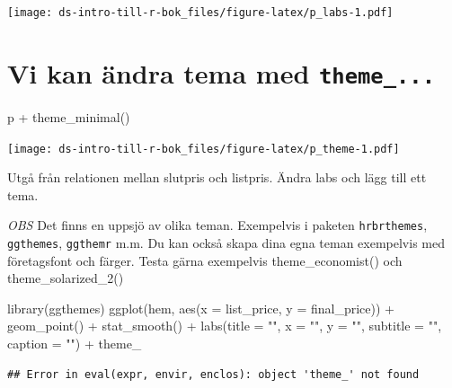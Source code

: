 \documentclass[
]{book}
\newenvironment{Shaded}{\begin{snugshade}}{\end{snugshade}}
\newcommand{\AttributeTok}[1]{\textcolor[rgb]{0.77,0.63,0.00}{#1}}
\newcommand{\FunctionTok}[1]{\textcolor[rgb]{0.00,0.00,0.00}{#1}}
\newcommand{\NormalTok}[1]{#1}
\newcommand{\SpecialCharTok}[1]{\textcolor[rgb]{0.00,0.00,0.00}{#1}}
\newcommand{\StringTok}[1]{\textcolor[rgb]{0.31,0.60,0.02}{#1}}
\begin{document}
\texttt{[image: ds-intro-till-r-bok\_files/figure-latex/p\_labs-1.pdf]}

\hypertarget{vi-kan-uxe4ndra-tema-med-theme_...}{%
\section{\texorpdfstring{Vi kan ändra tema med \texttt{theme\_...}}{Vi kan ändra tema med theme\_...}}\label{vi-kan-uxe4ndra-tema-med-theme_...}}

\begin{Shaded}
\begin{Highlighting}[]
\NormalTok{p }\SpecialCharTok{+} \FunctionTok{theme\_minimal}\NormalTok{()}
\end{Highlighting}
\end{Shaded}

\texttt{[image: ds-intro-till-r-bok\_files/figure-latex/p\_theme-1.pdf]}

Utgå från relationen mellan slutpris och listpris. Ändra labs och lägg till ett tema.

\emph{OBS} Det finns en uppsjö av olika teman. Exempelvis i paketen \texttt{hrbrthemes}, \texttt{ggthemes}, \texttt{ggthemr} m.m. Du kan också skapa dina egna teman exempelvis med företagsfont och färger. Testa gärna exempelvis theme\_economist() och theme\_solarized\_2()

\begin{Shaded}
\begin{Highlighting}[]
\FunctionTok{library}\NormalTok{(ggthemes)}
\FunctionTok{ggplot}\NormalTok{(hem, }\FunctionTok{aes}\NormalTok{(}\AttributeTok{x =}\NormalTok{ list\_price, }\AttributeTok{y =}\NormalTok{ final\_price)) }\SpecialCharTok{+}
  \FunctionTok{geom\_point}\NormalTok{() }\SpecialCharTok{+}
  \FunctionTok{stat\_smooth}\NormalTok{() }\SpecialCharTok{+}
  \FunctionTok{labs}\NormalTok{(}\AttributeTok{title =} \StringTok{""}\NormalTok{,}
       \AttributeTok{x =} \StringTok{""}\NormalTok{,}
       \AttributeTok{y =} \StringTok{""}\NormalTok{, }
       \AttributeTok{subtitle =} \StringTok{""}\NormalTok{,}
       \AttributeTok{caption =} \StringTok{""}\NormalTok{) }\SpecialCharTok{+}
\NormalTok{  theme\_}
\end{Highlighting}
\end{Shaded}

\begin{verbatim}
## Error in eval(expr, envir, enclos): object 'theme_' not found
\end{verbatim}
\end{document}

